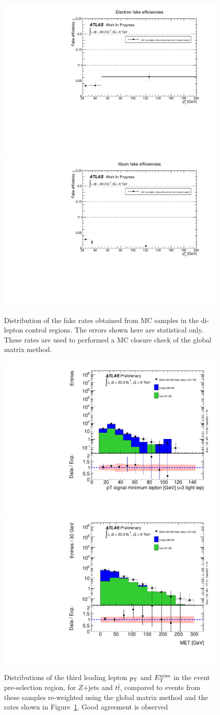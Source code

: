 \begin{figure}[ht!]
\centering
\includegraphics[width=0.42\columnwidth]{figures/ClosureCheck_MatrixMethod/ElFakeRates_MC_topZjets_new.pdf}
\includegraphics[width=0.42\columnwidth]{figures/ClosureCheck_MatrixMethod/MuFakeRates_MC_topZjets_new.pdf}
\caption{Distribution of the fake rates obtained from MC samples in the di-lepton control regions. The errors shown here are statistical only. These rates are used to performed a MC closure check of the global matrix method.}
\label{fig:MCFakeRatesClosure}
\end{figure}

\begin{figure}[ht!]
\centering
\includegraphics[width=0.42\columnwidth]{figures/ClosureCheck_MatrixMethod/PtThirdLepSignal_TTT_total_new.pdf}
\includegraphics[width=0.42\columnwidth]{figures/ClosureCheck_MatrixMethod/VR_PMET_lepTTT_total_new.pdf}
\caption{Distributions of the third leading lepton $p_{\mathrm{T}}$ and $E_{\mathrm{T}}^{\mathrm{miss}}$ in the event pre-selection region, for $Z$+jets and $t\bar{t}$, compared to events from these samples re-weighted using the global matrix method and the rates shown in Figure~\ref{fig:MCFakeRatesClosure}. Good agreement is observed}
\label{fig:MCClosureCheckMatrixMethod}
\end{figure}




